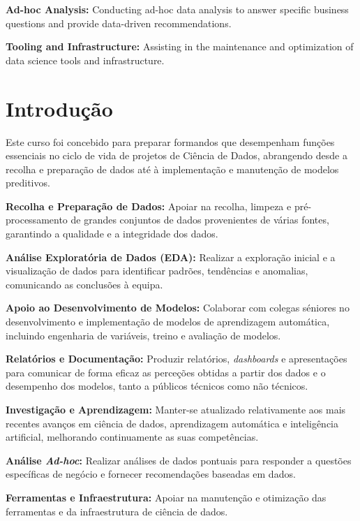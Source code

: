 \documentclass[12pt]{article}
\begin{document}
\noindent\textbf{Ad-hoc Analysis:} Conducting ad-hoc data analysis to answer specific business questions and provide data-driven recommendations.

\noindent\textbf{Tooling and Infrastructure:} Assisting in the maintenance and optimization of data science tools and infrastructure.

\vspace{0.5cm}

\section*{Introdução}

Este curso  foi concebido para preparar formandos que  desempenham funções essenciais no ciclo de vida de projetos de Ciência de Dados, abrangendo desde a recolha e preparação de dados até à implementação e manutenção de modelos preditivos. 

\noindent\textbf{Recolha e Preparação de Dados:} Apoiar na recolha, limpeza e pré-processamento de grandes conjuntos de dados provenientes de várias fontes, garantindo a qualidade e a integridade dos dados.

\noindent\textbf{Análise Exploratória de Dados (EDA):} Realizar a exploração inicial e a visualização de dados para identificar padrões, tendências e anomalias, comunicando as conclusões à equipa.

\noindent\textbf{Apoio ao Desenvolvimento de Modelos:} Colaborar com colegas séniores no desenvolvimento e implementação de modelos de aprendizagem automática, incluindo engenharia de variáveis, treino e avaliação de modelos.

\noindent\textbf{Relatórios e Documentação:} Produzir relatórios, \textit{dashboards} e apresentações para comunicar de forma eficaz as perceções obtidas a partir dos dados e o desempenho dos modelos, tanto a públicos técnicos como não técnicos.

\noindent\textbf{Investigação e Aprendizagem:} Manter-se atualizado relativamente aos mais recentes avanços em ciência de dados, aprendizagem automática e inteligência artificial, melhorando continuamente as suas competências.

\noindent\textbf{Análise \textit{Ad-hoc}:} Realizar análises de dados pontuais para responder a questões específicas de negócio e fornecer recomendações baseadas em dados.

\noindent\textbf{Ferramentas e Infraestrutura:} Apoiar na manutenção e otimização das ferramentas e da infraestrutura de ciência de dados.
\end{document}
